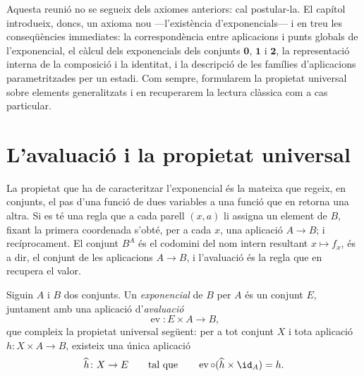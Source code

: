 Aquesta reunió no se segueix dels axiomes anteriors: cal postular-la. El
capítol introdueix, doncs, un axioma nou ---l'existència d'exponencials---
i en treu les conseqüències immediates: la correspondència entre
aplicacions i punts globals de l'exponencial, el càlcul dels exponencials
dels conjunts \(\mathbf0\), \(\mathbf1\) i \(\mathbf2\), la representació
interna de la composició i la identitat, i la descripció de les famílies
d'aplicacions parametritzades per un estadi. Com sempre, formularem la
propietat universal sobre elements generalitzats i en recuperarem la
lectura clàssica com a cas particular.

\section{L'avaluació i la propietat universal}\label{sec:exponencial-universal}

La propietat que ha de caracteritzar l'exponencial és la mateixa que
regeix, en conjunts, el pas d'una funció de dues variables a una funció
que en retorna una altra. Si es té una regla que a cada parell
\((x,a)\) li assigna un element de \(B\), fixant la primera coordenada
s'obté, per a cada \(x\), una aplicació \(A\to B\); i recíprocament. El
conjunt \(B^A\) és el codomini del nom intern resultant \(x\mapsto f_x\),
és a dir, el conjunt de les aplicacions \(A\to B\), i l'avaluació és la
regla que en recupera el valor.

\begin{definicio}[Exponencial]\label{def:exponencial}
Siguin \(A\) i \(B\) dos conjunts. Un \emph{exponencial} de \(B\) per
\(A\) és un conjunt \(E\), juntament amb una aplicació d'\emph{avaluació}
\[
\operatorname{ev}\colon E\times A\to B,
\]
que compleix la propietat universal següent: per a tot conjunt \(X\) i
tota aplicació \(h\colon X\times A\to B\), existeix una única aplicació
\[
\widehat h\colon X\to E
\qquad\text{tal que}\qquad
\operatorname{ev}\circ(\widehat h\times\id_A)=h.
\]
\end{definicio}

